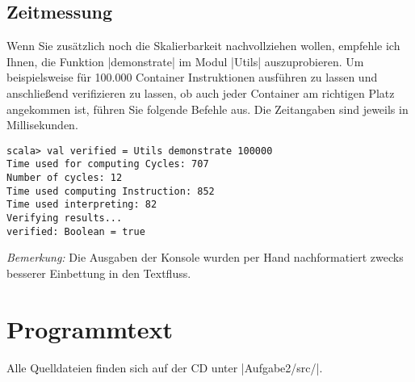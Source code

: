 \subsection{Zeitmessung}
Wenn Sie zusätzlich noch die Skalierbarkeit nachvollziehen wollen,
empfehle ich Ihnen, die Funktion |demonstrate| im Modul |Utils| auszuprobieren.
Um beispielsweise für 100.000 Container Instruktionen ausführen zu lassen und anschließend verifizieren zu lassen,
ob auch jeder Container am richtigen Platz angekommen ist, führen Sie folgende Befehle aus.
Die Zeitangaben sind jeweils in Millisekunden.
\begin{lstlisting}
scala> val verified = Utils demonstrate 100000 
Time used for computing Cycles: 707
Number of cycles: 12
Time used computing Instruction: 852
Time used interpreting: 82
Verifying results...
verified: Boolean = true
\end{lstlisting}

\begin{flushright}
\begin{footnotesize}
\emph{Bemerkung:} Die Ausgaben der Konsole wurden per Hand nachformatiert zwecks besserer Einbettung in den Textfluss.
\end{footnotesize}
\end{flushright}

\clearpage
\addtolength{\topmargin}{-.8cm}
\enlargethispage{2.8cm}
\addtolength{\textwidth}{1.8cm}
\section{Programmtext}
\fontsize{8pt}{8.4pt}
Alle Quelldateien finden sich auf der CD unter |Aufgabe2/src/|.
